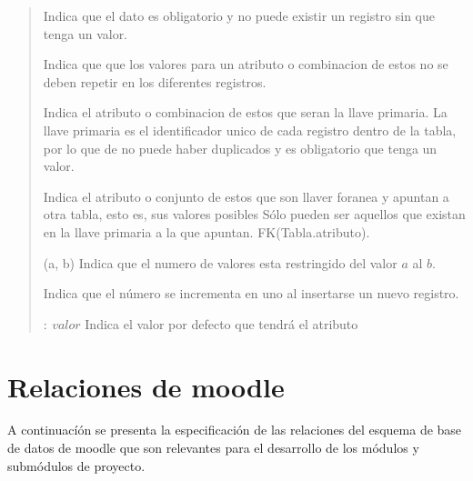     \begin{quote}
    \begin{bGlosario}
    
            Indica que el dato es obligatorio y no puede existir un registro sin que tenga
            un valor.
            
            Indica que que los valores para un atributo o combinacion de estos no se deben
            repetir en los diferentes registros.
            
            Indica el atributo o combinacion de estos que seran la llave primaria. La llave
            primaria es el identificador unico de cada registro dentro de la tabla, por lo
            que de no puede haber duplicados y es obligatorio que tenga un valor.
            
            Indica el atributo o conjunto de estos que son llaver foranea y apuntan a otra
            tabla, esto es, sus valores posibles Sólo pueden ser aquellos que existan en la
            llave primaria a la que apuntan. FK(Tabla.atributo).
            
        (a, b)
            Indica que el numero de valores esta restringido del valor $a$ al $b$.

            Indica que el número se incrementa en uno al insertarse un nuevo registro.

         $:\ valor$
            Indica el valor por defecto que tendrá el atributo
            
    \end{bGlosario}
    \end{quote}
    
\clearpage

\section{Relaciones de moodle}

 A continuacíón se presenta la especificación de las relaciones del esquema de base
 de datos de moodle que son relevantes para el desarrollo de los módulos y submódulos
 de proyecto.

